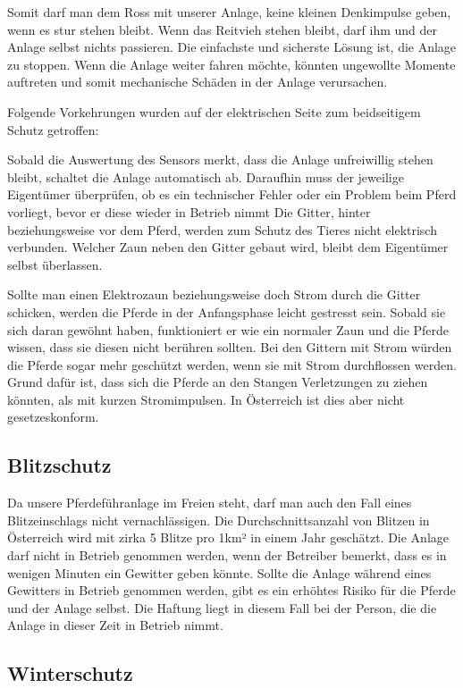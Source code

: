 \documentclass[12pt]{scrreprt} %
\begin{document}
Somit darf man dem Ross mit unserer Anlage, keine kleinen Denkimpulse geben, wenn es stur stehen bleibt. Wenn das Reitvieh stehen bleibt, darf ihm und der Anlage selbst nichts passieren. Die einfachste und sicherste Lösung ist, die Anlage zu stoppen. Wenn die Anlage weiter fahren möchte, könnten ungewollte Momente auftreten und somit mechanische Schäden in der Anlage verursachen.

Folgende Vorkehrungen wurden auf der elektrischen Seite zum beidseitigem Schutz getroffen:

Sobald die Auswertung des Sensors merkt, dass die Anlage unfreiwillig stehen bleibt, schaltet die Anlage automatisch ab. Daraufhin muss der jeweilige Eigentümer überprüfen, ob es ein technischer Fehler oder ein Problem beim Pferd vorliegt, bevor er diese wieder in Betrieb nimmt
Die Gitter, hinter beziehungsweise vor dem Pferd, werden zum Schutz des Tieres nicht elektrisch verbunden.
Welcher Zaun neben den Gitter gebaut wird, bleibt dem Eigentümer selbst überlassen.

Sollte man einen Elektrozaun beziehungsweise doch Strom durch die Gitter schicken, werden die Pferde in der Anfangsphase leicht gestresst sein. Sobald sie sich daran gewöhnt haben, funktioniert er wie ein normaler Zaun und die Pferde wissen, dass sie diesen nicht berühren sollten.
Bei den Gittern mit Strom würden die Pferde sogar mehr geschützt werden, wenn sie mit Strom durchflossen werden. Grund dafür ist, dass sich die Pferde an den Stangen Verletzungen zu ziehen könnten, als mit kurzen Stromimpulsen. In Österreich ist dies aber nicht gesetzeskonform.

\subsection{Blitzschutz}
\label{sec:blitzschutz}

Da unsere Pferdeführanlage im Freien steht, darf man auch den Fall eines Blitzeinschlags nicht vernachlässigen. 
Die Durchschnittsanzahl von Blitzen in Österreich wird mit zirka 5 Blitze pro 1km² in einem Jahr geschätzt. 
Die Anlage darf nicht in Betrieb genommen werden, wenn der Betreiber bemerkt, 
dass es in wenigen Minuten ein Gewitter geben könnte.
Sollte die Anlage während eines Gewitters in Betrieb genommen werden, 
gibt es ein erhöhtes Risiko für die Pferde und der Anlage selbst.
Die Haftung liegt in diesem Fall bei der Person, die die Anlage in dieser Zeit in Betrieb nimmt.

\subsection{Winterschutz}
\label{sec:winterschutz}
\end{document}
